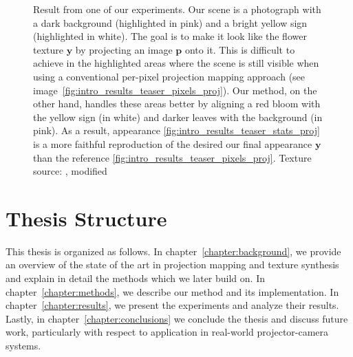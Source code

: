 \begin{figure}[ht]
\begin{subfigure}{\textwidth}
    \end{subfigure}
    \caption{Result from one of our experiments. Our scene is a photograph with a dark background (highlighted in pink) and a bright yellow sign (highlighted in white). The goal is to make it look like the flower texture \(\bm{y}\) by projecting an image \(\bm{p}\) onto it. This is difficult to achieve in the highlighted areas where the scene is still visible when using a conventional per-pixel projection mapping approach (see image~\ref{fig:intro_results_teaser_pixels_proj}). Our method, on the other hand, handles these areas better by aligning a red bloom with the yellow sign (in white) and darker leaves with the background (in pink). As a result, appearance \ref{fig:intro_results_teaser_stats_proj} is a more faithful reproduction of the desired our final appearance \(\bm{y}\) than the reference \ref{fig:intro_results_teaser_pixels_proj}. Texture source: \citet{Pixar128}, modified}
    \label{fig:intro_result_teaser}
\end{figure}

\section{Thesis Structure}
\label{section:intro-thesis_structure}

This thesis is organized as follows. In chapter~\ref{chapter:background}, we provide an overview of the state of the art in projection mapping and texture synthesis and explain in detail the methods which we later build on. In chapter~\ref{chapter:methods}, we describe our method and its implementation. In chapter~\ref{chapter:results}, we present the experiments and analyze their results. Lastly, in chapter~\ref{chapter:conclusions} we conclude the thesis and discuss future work, particularly with respect to application in real-world projector-camera systems.
